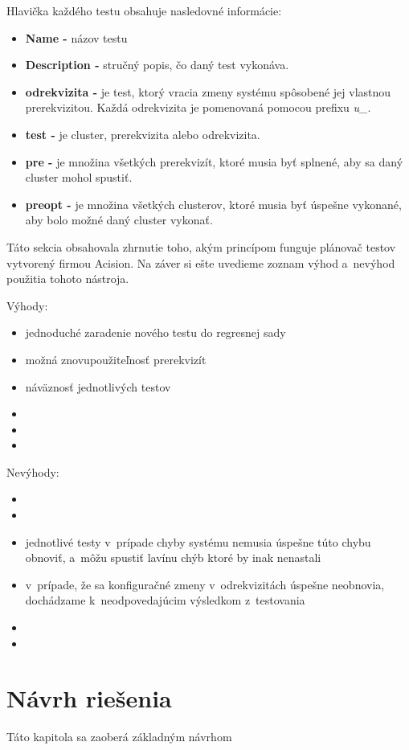 Hlavička každého testu obsahuje nasledovné informácie:
\begin{itemize}
\item \textbf{Name -} názov testu
\item \textbf{Description -} stručný popis, čo daný test vykonáva. 
\item \textbf{odrekvizita -} je test, ktorý vracia zmeny systému spôsobené jej vlastnou prerekvizitou. Každá odrekvizita je pomenovaná
pomocou prefixu {\it u\_}. 
\item \textbf{test -} je cluster, prerekvizita alebo odrekvizita.
\item \textbf{pre -} je množina všetkých prerekvizít, ktoré musia byť splnené, aby sa daný cluster mohol spustiť.
\item \textbf{preopt -} je množina všetkých clusterov, ktoré musia byť úspešne vykonané, aby bolo možné daný cluster vykonať.  
\end{itemize}

Táto sekcia obsahovala zhrnutie toho, akým princípom funguje plánovač testov vytvorený firmou Acision.
Na záver si ešte uvedieme zoznam výhod a~nevýhod použitia tohoto nástroja.

\noindent Výhody:
\begin{itemize}
\item jednoduché zaradenie nového testu do regresnej sady
\item možná znovupoužiteľnosť prerekvizít
\item náväznosť jednotlivých testov
\item 
\item 
\item 
\end{itemize} 

\noindent Nevýhody:
\begin{itemize}
\item 
\item  
\item jednotlivé testy v~prípade chyby systému nemusia úspešne túto chybu obnoviť, a~môžu spustiť lavínu chýb ktoré by inak nenastali 
\item v~prípade, že sa konfiguračné zmeny v~odrekvizitách úspešne neobnovia, dochádzame k~neodpovedajúcim výsledkom z~testovania
\item 
\item 
\end{itemize}

\chapter{Návrh riešenia}
Táto kapitola sa zaoberá základným návrhom
